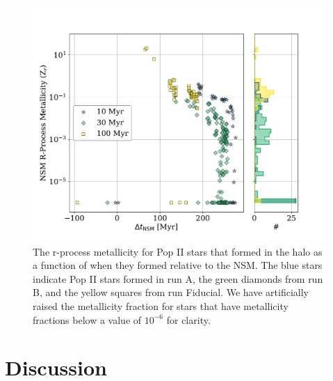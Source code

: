 \documentclass[fleqn,usenatbib]{mnras}
\begin{document}
\begin{figure} 
	\includegraphics[width=\columnwidth]{plots/time_NSM_deltat.pdf}
	\caption[R-process metallicity fraction as a function of $\Delta t_{\mathrm{NSM}}$ for the delay time variation runs.]{The r-process metallicity for Pop II stars that formed in the halo as a function of when they formed relative to the NSM. The blue stars indicate Pop II stars formed in run A, the green diamonds from run B, and the yellow squares from run Fiducial. We have artificially raised the metallicity fraction for stars that have metallicity fractions below a value of $10^{-6}$ for clarity.}
	\label{fig:time_NSM_deltat}
\end{figure}

\section{Discussion} \label{sec:discussion}
\end{document}

